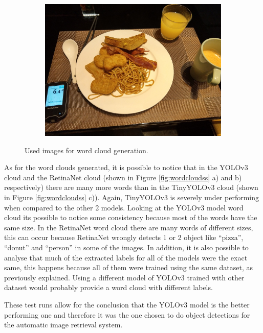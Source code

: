 \begin{figure}[H]
\begin{subfigure}{\linewidth}
      \includegraphics[width=.3\linewidth]{Sections/4InitialWork/4_images_wordcloud/photo6.jpg}
      \end{subfigure}\par\medskip
      \caption{Used images for word cloud generation.}
      \label{fig:used_word}
    \end{figure}

    As for the word clouds generated, it is possible to notice that in the YOLOv3 cloud and the RetinaNet cloud (shown in Figure \ref{fig:wordcloudss} a) and b) respectively) there are many more words than in the TinyYOLOv3 cloud (shown in Figure \ref{fig:wordcloudss} c)). Again, TinyYOLOv3 is severely under performing when compared to the other 2 models. Looking at the YOLOv3 model word cloud its possible to notice some consistency because most of the words have the same size. In the RetinaNet word cloud there are many words of different sizes, this can occur because RetinaNet wrongly detects 1 or 2 object like \enquote{pizza}, \enquote{donut} and \enquote{person} in some of the images.  In addition, it is also possible to analyse that much of the extracted labels for all of the models were the exact same, this happens because all of them were trained using the same dataset, as previously explained. Using a different model of YOLOv3 trained with other dataset would probably provide a word cloud with different labels.

    These test runs allow for the conclusion that the YOLOv3 model is the better performing one and therefore it was the one chosen to do object detections for the automatic image retrieval system.

